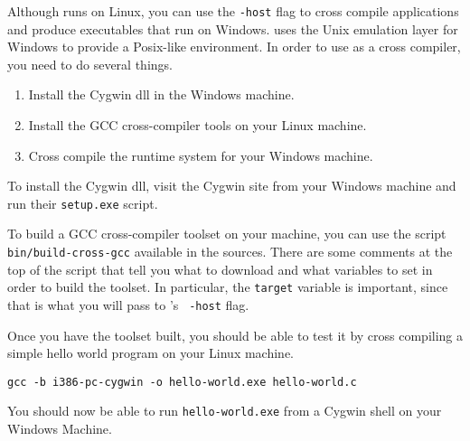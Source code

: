 
Although {\mlton} runs on Linux, you can use the {\tt -host} flag to cross
compile applications and produce executables that run on Windows.  {\mlton} uses
the  Unix emulation layer for
Windows to provide a Posix-like environment.  In order to use {\mlton} as a
cross compiler, you need to do several things.

\begin{enumerate}

\item Install the Cygwin dll in the Windows machine.

\item Install the GCC cross-compiler tools on your Linux machine.

\item Cross compile the {\mlton} runtime system for your Windows machine.

\end{enumerate}

To install the Cygwin dll, visit the Cygwin site from your Windows machine and
run their {\tt setup.exe} script.

To build a GCC cross-compiler toolset on your machine, you can use the script
{\tt bin/build-cross-gcc} available in the {\mlton} sources.  There are some
comments at the top of the script that tell you what to download and what
variables to set in order to build the toolset.  In particular, the {\tt target}
variable is important, since that is what you will pass to {\mlton}'s {\tt
-host} flag.

Once you have the toolset built, you should be able to test it by cross
compiling a simple hello world program on your Linux machine.
\begin{verbatim}
gcc -b i386-pc-cygwin -o hello-world.exe hello-world.c
\end{verbatim}
You should now be able to run {\tt hello-world.exe} from a Cygwin shell on your
Windows Machine.

